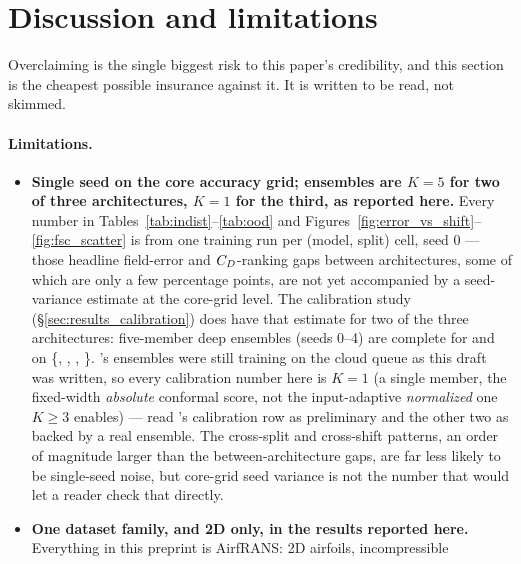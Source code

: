 \documentclass[11pt,a4paper]{article}
\begin{document}
\section{Discussion and limitations}
\label{sec:discussion}

Overclaiming is the single biggest risk to this paper's credibility, and this
section is the cheapest possible insurance against it. It is written to be
read, not skimmed.

\paragraph{Limitations.}
\begin{itemize}\itemsep2pt
  \item \textbf{Single seed on the core accuracy grid; ensembles are $K=5$ for
        two of three architectures, $K=1$ for the third, as reported here.}
        Every number in Tables~\ref{tab:indist}--\ref{tab:ood} and
        Figures~\ref{fig:error_vs_shift}--\ref{fig:fsc_scatter} is from one
        training run per (model, split) cell, seed 0 --- those headline
        field-error and $C_D$-ranking gaps between architectures, some of
        which are only a few percentage points, are not yet accompanied by a
        seed-variance estimate at the core-grid level. The calibration study
        (\S\ref{sec:results_calibration}) does have that estimate for two of
        the three architectures: five-member deep ensembles (seeds 0--4) are
        complete for \Mfno{} and \Mtrans{} on \{,
        , , \}. \Mgnn's
        ensembles were still training on the cloud queue as this draft was
        written, so every \Mgnn{} calibration number here is $K=1$ (a single
        member, the fixed-width \emph{absolute} conformal score, not the
        input-adaptive \emph{normalized} one $K\geq3$ enables) --- read
        \Mgnn's calibration row as preliminary and the other two as backed by
        a real ensemble. The cross-split and cross-shift patterns, an order of
        magnitude larger than the between-architecture gaps, are far less
        likely to be single-seed noise, but core-grid seed variance is not
        the number that would let a reader check that directly.
  \item \textbf{One dataset family, and 2D only, in the results reported here.}
        Everything in this preprint is AirfRANS: 2D airfoils, incompressible

\end{itemize}
\end{document}
